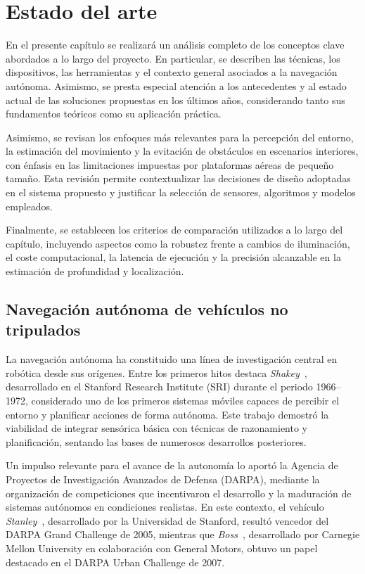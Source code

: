 \chapter{Estado del arte}

En el presente capítulo se realizará un análisis completo de los conceptos clave abordados a lo largo del proyecto. En particular, 
se describen las técnicas, los dispositivos, las herramientas y el contexto general asociados a la navegación autónoma. Asimismo, 
se presta especial atención a los antecedentes y al estado actual de las soluciones propuestas en los últimos años, considerando tanto 
sus fundamentos teóricos como su aplicación práctica.

Asimismo, se revisan los enfoques más relevantes para la percepción del entorno, la estimación del movimiento y la evitación de obstáculos 
en escenarios interiores, con énfasis en las limitaciones impuestas por plataformas aéreas de pequeño tamaño. Esta revisión permite 
contextualizar las decisiones de diseño adoptadas en el sistema propuesto y justificar la selección de sensores, algoritmos y modelos 
empleados.

Finalmente, se establecen los criterios de comparación utilizados a lo largo del capítulo, incluyendo aspectos como la robustez frente a 
cambios de iluminación, el coste computacional, la latencia de ejecución y la precisión alcanzable en la estimación de profundidad y 
localización.

\section{Navegación autónoma de vehículos no tripulados}
    La navegación autónoma ha constituido una línea de investigación central en robótica desde sus orígenes. Entre los primeros hitos destaca 
    \textit{Shakey}~\cite{shakey}, desarrollado en el Stanford Research Institute (SRI) durante el periodo 1966--1972, considerado uno de los 
    primeros sistemas móviles capaces de percibir el entorno y planificar acciones de forma autónoma. Este trabajo demostró la viabilidad de 
    integrar sensórica básica con técnicas de razonamiento y planificación, sentando las bases de numerosos desarrollos posteriores.

    Un impulso relevante para el avance de la autonomía lo aportó la Agencia de Proyectos de Investigación Avanzados de Defensa (DARPA), 
    mediante la organización de competiciones que incentivaron el desarrollo y la maduración de sistemas autónomos en condiciones realistas. 
    En este contexto, el vehículo \textit{Stanley}~\cite{stanley}, desarrollado por la Universidad de Stanford, resultó vencedor del 
    DARPA Grand Challenge de 2005, mientras que \textit{Boss}~\cite{boss}, desarrollado por Carnegie Mellon University en colaboración con 
    General Motors, obtuvo un papel destacado en el DARPA Urban Challenge de 2007.

